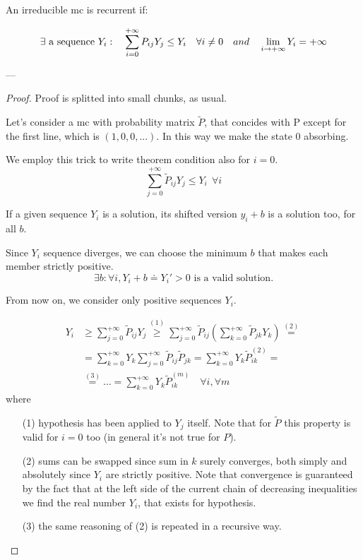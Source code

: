 \begin{theorem}
	An irreducible \gls{mc} is recurrent if:

	\begin{equation}\noindent
		\exists \text{ a sequence } Y_i : \quad
		\sum\limits_{i=0}^{+\infty} P_{ij} Y_j \le Y_i \quad \forall i \neq 0 \quad and \quad
		\lim\limits_{i \to +\infty} Y_i = +\infty
		\end{equation}
\end{theorem}
---
\begin{proof}
	Proof is splitted into small chunks, as usual.

	\proofpart
		Let's consider a \gls{mc} with probability matrix $\tilde{P}$, that concides with P except for the first line, which is $(1, 0, 0, ...)$.
		In this way we make the state 0 absorbing.

		We employ this trick to write theorem condition also for $i=0$.
		$$ \sum_{j=0}^{+\infty} \tilde{P}_{ij} Y_j \le Y_i ~~ \forall i$$

	\proofpart
		If a given sequence $Y_i$ is a solution, its shifted version $y_i + b$ is a solution too, for all $b$.

		Since $Y_i$ sequence diverges, we can choose the minimum $b$ that makes each member strictly positive.
		\begin{equation}
			\exists b: \forall i, Y_i + b \doteq Y_i' > 0 \text{ is a valid solution.}
		\end{equation}

		From now on, we consider only positive sequences $Y_i$.

	\proofpart
		\begin{equation}\begin{split}
			Y_i & \ge \sum_{j=0}^{+\infty} \tilde{P}_{ij} Y_j \stackrel{(1)}{\ge}
			\sum_{j=0}^{+\infty} \tilde{P}_{ij} \left( \sum_{k=0}^{+\infty} \tilde{P}_{jk} Y_k \right) \stackrel{(2)}{=} \\
			& = \sum_{k=0}^{+\infty} Y_k \sum_{j=0}^{+\infty} \tilde{P}_{ij}  \tilde{P}_{jk} =
			\sum_{k=0}^{+\infty} Y_k \tilde{P}_{ik}^{(2)} = \\
			& \stackrel{(3)}{=} \ldots = \sum_{k=0}^{+\infty} Y_k \tilde{P}_{ik}^{(m)} \quad\forall i,\forall m
		\end{split}\end{equation}
		where
		\begin{itemize}
			\item[(1)] hypothesis has been applied to $Y_j$ itself. Note that for $\tilde{P}$ this property is valid for $i=0$ too (in general it's not true for $P$).
			\item[(2)] sums can be swapped since sum in $k$ surely converges, both simply and absolutely since $Y_i$ are strictly positive. Note that convergence is guaranteed by the fact that at the left side of the current chain of decreasing inequalities we find the real number $Y_i$, that exists for hypothesis.
			\item[(3)] the same reasoning of (2) is repeated in a recursive way.
		\end{itemize}


\end{proof}

